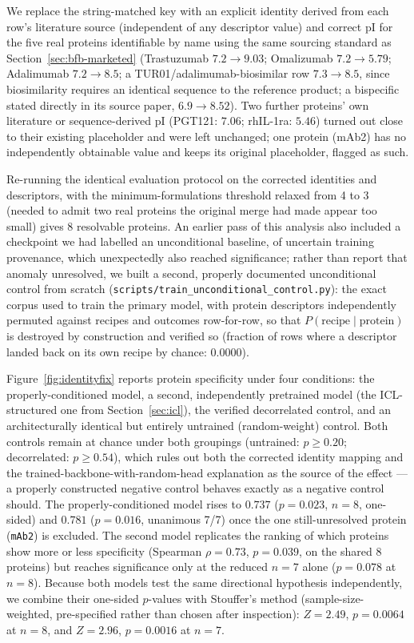 \documentclass[twocolumn,10pt]{article}
\begin{document}
We replace the string-matched key with an explicit identity derived from each
row's literature source (independent of any descriptor value) and correct pI for
the five real proteins identifiable by name using the same sourcing standard as
Section~\ref{sec:bfb-marketed} (Trastuzumab $7.2\to9.03$; Omalizumab
$7.2\to5.79$; Adalimumab $7.2\to8.5$; a TUR01/adalimumab-biosimilar row
$7.3\to8.5$, since biosimilarity requires an identical sequence to the reference
product; a bispecific stated directly in its source paper, $6.9\to8.52$). Two
further proteins' own literature or sequence-derived pI (PGT121: $7.06$; rhIL-1ra:
$5.46$) turned out close to their existing placeholder and were left unchanged;
one protein (mAb2) has no independently obtainable value and keeps its original
placeholder, flagged as such.

Re-running the identical evaluation protocol on the corrected identities and
descriptors, with the minimum-formulations threshold relaxed from 4 to 3 (needed
to admit two real proteins the original merge had made appear too small) gives 8
resolvable proteins. An earlier pass of this analysis also included a checkpoint
we had labelled an unconditional baseline, of uncertain training provenance,
which unexpectedly also reached significance; rather than report that anomaly
unresolved, we built a second, properly documented unconditional control from
scratch (\texttt{scripts/train\_unconditional\_control.py}): the exact corpus
used to train the primary model, with protein descriptors independently
permuted against recipes and outcomes row-for-row, so that $P(\text{recipe}
\mid \text{protein})$ is destroyed by construction and verified so (fraction of
rows where a descriptor landed back on its own recipe by chance: $0.0000$).

Figure~\ref{fig:identityfix} reports protein specificity under four conditions:
the properly-conditioned model, a second, independently pretrained model (the
ICL-structured one from Section~\ref{sec:icl}), the verified decorrelated
control, and an architecturally identical but entirely untrained (random-weight)
control. Both controls remain at chance under both groupings (untrained:
$p \geq 0.20$; decorrelated: $p \geq 0.54$), which rules out both the corrected
identity mapping and the trained-backbone-with-random-head explanation as the
source of the effect --- a properly constructed negative control behaves exactly
as a negative control should. The properly-conditioned model rises to $0.737$
($p=0.023$, $n=8$, one-sided) and $0.781$ ($p=0.016$, unanimous 7/7) once the one
still-unresolved protein (\texttt{mAb2}) is excluded. The second model replicates
the ranking of which proteins show more or less specificity (Spearman
$\rho=0.73$, $p=0.039$, on the shared 8 proteins) but reaches significance only
at the reduced $n=7$ alone ($p=0.078$ at $n=8$). Because both models test the same
directional hypothesis independently, we combine their one-sided $p$-values with
Stouffer's method (sample-size-weighted, pre-specified rather than chosen after
inspection): $Z=2.49$, $p=0.0064$ at $n=8$, and $Z=2.96$, $p=0.0016$ at $n=7$.
\end{document}
